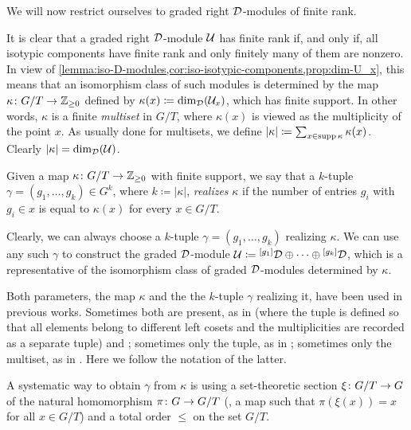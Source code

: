 We will now restrict ourselves to graded right $\mathcal{D}$-modules of finite rank.

It is clear that a graded right $\mathcal{D}$-module $\mathcal U$ has finite rank if, and only if, all isotypic components have finite rank and only finitely many of them are nonzero. 
In view of \cref{lemma:iso-D-modules,cor:iso-isotypic-components,prop:dim-U_x}, this means that an isomorphism class of such modules is determined by the map $\kappa \colon G/T \to \mathbb{Z}_{\geq 0}$ defined by $\kappa(x) \coloneqq \dim_{\mathcal{D}} (\mathcal U_x)$, which has finite support. 
In other words, $\kappa$ is a finite \emph{multiset} in $G/T$, where $\kappa(x)$ is viewed as the multiplicity of the point $x$. 
As usually done for multisets, we define $|\kappa| \coloneqq \sum_{x \in \operatorname{supp} \kappa} \kappa(x)$. 
Clearly $|\kappa| = \dim_{\mathcal{D}} (\mathcal U)$.

\begin{defi}\label{defi:gamma-realizes-kappa}
    Given a map $\kappa\colon G/T \to \mathbb{Z}_{\geq 0}$ with finite support, we say that a $k$-tuple $\gamma = (g_1, \ldots, g_k) \in G^k$, where $k \coloneqq |\kappa|$, \emph{realizes} $\kappa$ if the number of entries $g_i$ with $g_i\in x$ is equal to $\kappa (x)$ for every $x\in G/T$.
\end{defi}

Clearly, we can always choose a $k$-tuple $\gamma = (g_1, \ldots, g_k)$ realizing $\kappa$. 
We can use any such $\gamma$ to construct the graded $\mathcal{D}$-module $\mathcal U \coloneqq {}^{[g_1]}\mathcal{D} \oplus \cdots \oplus {}^{[g_k]}\mathcal{D}$, which is a representative of the isomorphism class of graded $\mathcal{D}$-modules determined by $\kappa$. 

\begin{remark}\label{rmk:kappa-as-parameter}
	Both parameters, the map $\kappa$ and the the $k$-tuple $\gamma$ realizing it, have been used in previous works. 
	Sometimes both are present, as in \cite{livromicha} (where the tuple is defined so that all elements belong to different left cosets and the multiplicities are recorded as a separate tuple) and \cite{paper-Qn,paper-MAP}; sometimes only the tuple, as in \cite{BK10}; sometimes only the multiset, as in \cite{paper-adrian,Misha-Felipe}.
	Here we follow the notation of the latter.
\end{remark}

A systematic way to obtain $\gamma$ from $\kappa$ is using a set-theoretic section $\xi\colon G/T \to G$ of the natural homomorphism $\pi\colon G \to G/T$ (\ie, a map such that $\pi(\xi(x)) = x$ for all $x \in G/T$) and a total order $\leq$ on the set $G/T$. 

